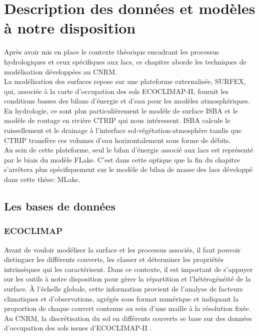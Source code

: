 \chapter{{\selectfont Description des données et modèles à notre disposition}}
\label{chap:descriptions}
\minitoc

\noindent Après avoir mis en place le contexte théorique encadrant les processus hydrologiques et ceux spécifiques aux lacs, ce chapitre aborde les techniques de modélisation développées au CNRM.\\
La modélisation des surfaces repose sur une plateforme externalisée, SURFEX, qui, associée à la carte d'occupation des sols ECOCLIMAP-II, fournit les conditions basses des bilans d'énergie et d'eau pour les modèles atmosphériques. En hydrologie, ce sont plus particulièrement le modèle de surface ISBA et le modèle de routage en rivière CTRIP qui nous intéressent. ISBA calcule le ruissellement et le drainage à l'interface sol-végétation-atmosphère tandis que CTRIP transfère ces volumes d'eau horizontalement sous forme de débits.\\
Au sein de cette plateforme, seul le bilan d'énergie associé aux lacs est représenté par le biais du modèle FLake. C'est dans cette optique que la fin du chapitre s'arrêtera plus spécifiquement sur le modèle de bilan de masse des lacs développé dans cette thèse: MLake.

\section{{\selectfont Les bases de données}}
\subsection{{\selectfont ECOCLIMAP}}
\label{sec:ECOCLIMAP}

Avant de vouloir modéliser la surface et les processus associés, il faut pouvoir distinguer les différents couverts, les classer et déterminer les propriétés intrinsèques qui les caractérisent. Dans ce contexte, il est important de s'appuyer sur les outils à notre disposition pour gèrer la répartition et l'hétérogénéité de la surface. À l'échelle globale, cette information provient de l'analyse de facteurs climatiques et d'observations, agrégés sous format numérique et indiquant la proportion de chaque couvert contenue au sein d'une maille à la résolution fixée. Au CNRM, la discrétisation du sol en différents couverts se base sur des données d'occupation des sols issues d'ECOCLIMAP-II \citep[figure \ref{ecoclimap},][]{faroux2013}.\\

